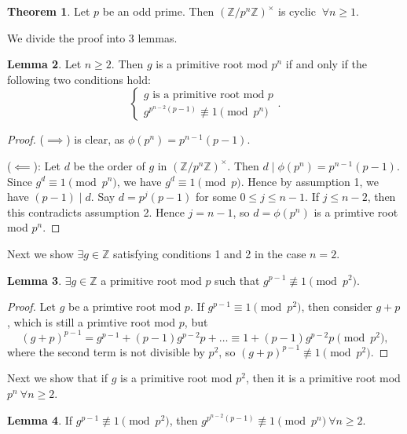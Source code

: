 \documentclass{article}
\theoremstyle{definition}
\newtheorem{theorem}{Theorem}[section]
\newtheorem{lemma}[theorem]{Lemma}
\theoremstyle{remark}
\begin{document}
\begin{theorem}%
    Let $p$ be an odd prime. Then $(\mathbb{Z}/p^n\mathbb{Z})^{\times}$ is cyclic $~\forall n\ge 1$.
\end{theorem}
We divide the proof into 3 lemmas.
\begin{lemma}%
    Let $n \ge 2$. Then $g$ is a primitive root mod $p^n$ if and only if the following two conditions hold: 
    \[
    \begin{cases}
        g \text{ is a primitive root mod }p \\
        g^{p^{n-2}(p-1)} \not\equiv 1 \pmod{p^n}
    \end{cases}.
    \]
\end{lemma}
\begin{proof}
    ($\implies $) is clear, as $\phi(p^n)=p^{n-1}(p-1)$.

    ($\impliedby$): Let $d$ be the order of $g$ in $(\mathbb{Z}/p^n\mathbb{Z})^{\times}$. Then $d \mid \phi(p^n) = p^{n-1}(p-1)$. Since $g^d \equiv 1 \pmod{p^n}$, we have $g^d \equiv 1 \pmod{p}$. Hence by assumption 1, we have $(p-1)\mid d$. Say $d = p^j (p-1)$ for some $0\le j \le n-1$. If $j\le n-2$, then this contradicts assumption 2. Hence $j=n-1$, so $d=\phi(p^n)$ is a primtive root mod $p^n$.
\end{proof}
Next we show $\exists g \in \mathbb{Z}$ satisfying conditions 1 and 2 in the case $n=2$.
\begin{lemma}
    $\exists g \in \mathbb{Z}$ a primitive root mod $p$ such that $g^{p-1} \not\equiv 1 \pmod{p^2}$.
\end{lemma}
\begin{proof}
    Let $g$ be a primtive root mod $p$. If $g^{p-1} \equiv 1\pmod{p^2}$, then consider $g+p$, which is still a primtive root mod $p$, but
    \[
    (g+p)^{p-1}=g^{p-1} + (p-1)g^{p-2}p + \ldots \equiv 1 + (p-1)g^{p-2}p \pmod{p^2},
    \]
    where the second term is not divisible by $p^2$, so $(g+p)^{p-1} \not\equiv 1 \pmod{p^2}$.
\end{proof}
Next we show that if $g$ is a primitive root mod $p^2$, then it is a primitive root mod $p^n ~\forall n\ge 2$.
\begin{lemma}
    If $g^{p-1} \not\equiv 1 \pmod{p^2}$, then $g^{p^{n-2}(p-1)} \not\equiv 1\pmod{p^n} ~\forall n\ge 2$. 
\end{lemma}
\end{document}

